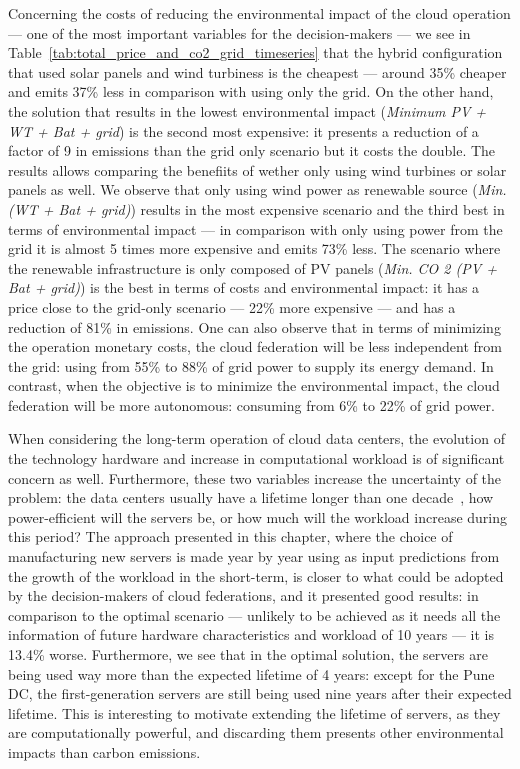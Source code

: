 Concerning the costs of reducing the environmental impact of the cloud operation --- one of the most important variables for the decision-makers --- we see in Table~\ref {tab:total_price_and_co2_grid_timeseries} that the hybrid configuration that used solar panels and wind turbiness is the cheapest ---  around 35\% cheaper and emits 37\% less  in comparison with using only the grid.  On the other hand, the solution that results in the lowest environmental impact (\textit{Minimum  PV + WT + Bat + grid}) is the second most expensive: it presents a reduction of a factor of 9 in  emissions than the grid only scenario but it costs the double. The results allows comparing the benefiits of wether only using wind turbines or solar panels as well. We observe that only using wind power as renewable source (\textit{Min.  (WT + Bat + grid)}) results in the most expensive scenario and the third best in terms of environmental impact --- in comparison with only using power from the grid it is almost 5 times more expensive and emits 73\% less. The scenario where the renewable infrastructure is only composed of PV panels (\textit{Min. CO 2 (PV + Bat + grid)}) is the best in terms of costs and environmental impact: it has a price close to the grid-only scenario --- 22\% more expensive --- and has a reduction of 81\% in  emissions. One can also observe that in terms of minimizing the operation monetary costs, the cloud federation will be less independent from the grid: using from 55\% to 88\% of grid power to supply its energy demand. In contrast, when the objective is to minimize the environmental impact, the cloud federation will be more autonomous: consuming from 6\% to 22\% of grid power. 

When considering the long-term operation of cloud data centers, the evolution of the technology hardware and increase in computational workload is of significant concern as well. Furthermore, these two variables increase the uncertainty of the problem: the data centers usually have a lifetime longer than one decade~\cite{datacenter_as_computer}, how power-efficient will the servers be, or how much will the workload increase during this period? The approach presented in this chapter, where the choice of manufacturing new servers is made year by year using as input predictions from the growth of the workload in the short-term, is closer to what could be adopted by the decision-makers of cloud federations, and it presented good results: in comparison to the optimal scenario --- unlikely to be achieved as it needs all the information of future hardware characteristics and workload of 10 years --- it is 13.4\% worse. Furthermore, we see that in the optimal solution, the servers are being used way more than the expected lifetime of 4 years: except for the Pune DC, the first-generation servers are still being used nine years after their expected lifetime. This is interesting to motivate extending the lifetime of servers, as they are computationally powerful, and discarding them presents other environmental impacts than carbon emissions. 

